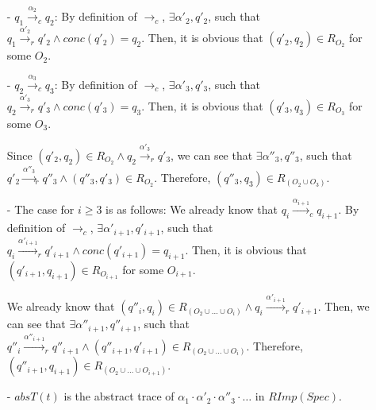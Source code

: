 \begin{itemize}
\setlength{\itemsep}{0.5pt}
\item[-] $q_1 {\xrightarrow{\alpha_2}}_c q_2$: By definition of $\rightarrow_c$, $\exists \alpha'_2, q'_2$, such that $q_1 {\xrightarrow{\alpha'_2}}_r q'_2 \wedge conc(q'_2)=q_2$. Then, it is obvious that $(q'_2,q_2) \in R_{O_2}$ for some $O_2$.

\item[-] $q_2 {\xrightarrow{\alpha_3}}_c q_3$: By definition of $\rightarrow_c$, $\exists \alpha'_3, q'_3$, such that $q_2 {\xrightarrow{\alpha'_3}}_r q'_3 \wedge conc(q'_3)=q_3$. Then, it is obvious that $(q'_3,q_3) \in R_{O_3}$ for some $O_3$.

Since $(q'_2,q_2) \in R_{O_2} \wedge q_2 {\xrightarrow{\alpha'_3}}_r q'_3$, we can see that $\exists \alpha''_3,q''_3$, such that $q'_2 {\xrightarrow{\alpha''_3}}_r q''_3 \wedge (q''_3,q'_3) \in R_{O_2}$. Therefore, $(q''_3,q_3) \in R_{(O_2 \cup O_3)}$. 

\item[-] The case for $i \geq 3$ is as follows: We already know that $q_i {\xrightarrow{\alpha_{i+1}}}_c q_{i+1}$. By definition of $\rightarrow_c$, $\exists \alpha'_{i+1}, q'_{i+1}$, such that $q_i {\xrightarrow{\alpha'_{i+1}}}_r q'_{i+1} \wedge conc(q'_{i+1})=q_{i+1}$. Then, it is obvious that $(q'_{i+1},q_{i+1}) \in R_{O_{i+1}}$ for some $O_{i+1}$.

We already know that $(q''_i,q_i) \in R_{(O_2 \cup \ldots \cup O_i)} \wedge q_i {\xrightarrow{\alpha'_{i+1}}}_r q'_{i+1}$. Then, we can see that $\exists \alpha''_{i+1},q''_{i+1}$, such that $q''_i {\xrightarrow{\alpha''_{i+1}}}_r q''_{i+1} \wedge (q''_{i+1},q'_{i+1}) \in R_{(O_2 \cup \ldots \cup O_i)}$. Therefore, $(q''_{i+1},q_{i+1}) \in R_{(O_2 \cup \ldots \cup O_{i+1})}$. 



\item[-] $absT(t)$ is the abstract trace of $\alpha_1 \cdot \alpha'_2 \cdot \alpha''_3 \cdot \ldots$ in $RImp(Spec)$.
\end{itemize} 

